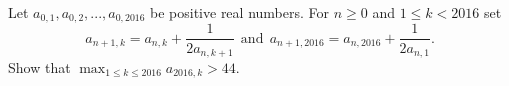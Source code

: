 Let $a_{0,1}, a_{0,2}, . . . , a_{0, 2016}$  be positive real numbers. For $n\geq  0$ and $1 \leq  k < 2016$ set $$a_{n+1,k} = a_{n,k} +\frac{1}{2a_{n,k+1}} \ \  \text{and} \ \  a_{n+1,2016} = a_{n,2016} +\frac{1}{2a_{n,1}}.$$Show that $\max_{1\leq k \leq 2016} a_{2016,k} > 44.$